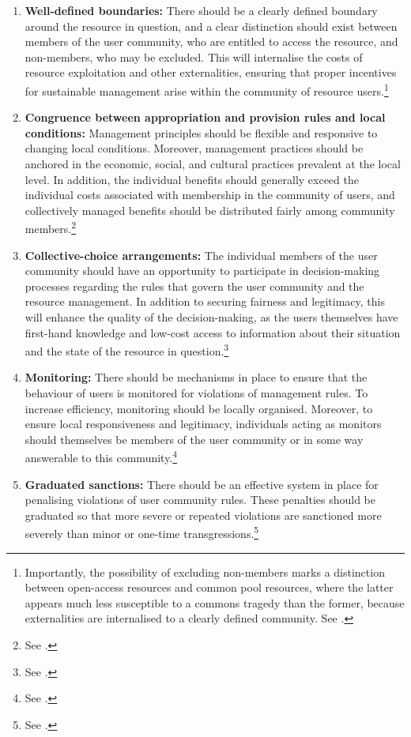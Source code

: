 \begin{enumerate}
\item {\bf Well-defined boundaries:} There should be a clearly defined boundary around the resource in question, and a clear distinction should exist between members of the user community, who are entitled to access the resource, and non-members, who may be excluded. This will internalise the costs of resource exploitation and other externalities, ensuring that proper incentives for sustainable management arise within the community of resource users.\footnote{Importantly, the possibility of excluding non-members marks a distinction between open-access resources and common pool resources, where the latter appears much less susceptible to a commons tragedy than the former, because externalities are internalised to a clearly defined community. See \cite[91-92]{ostrom90}.}
\item {\bf Congruence between appropriation and provision rules and local conditions:} Management principles should be flexible and responsive to changing local conditions. Moreover, management practices should be anchored in the economic, social, and cultural practices prevalent at the local level. In addition, the individual benefits should generally exceed the individual costs associated with membership in the community of users, and collectively managed benefits should be distributed fairly among community members.\footnote{See \cite[92]{ostrom90}.}
\item {\bf Collective-choice arrangements:} The individual members of the user community should have an opportunity to participate in decision-making processes regarding the rules that govern the user community and the resource management. In addition to securing fairness and legitimacy, this will enhance the quality of the decision-making, as the users themselves have first-hand knowledge and low-cost access to information about their situation and the state of the resource in question.\footnote{See \cite[93]{ostrom90}.}
\item {\bf Monitoring:} There should be mechanisms in place to ensure that the behaviour of users is monitored for violations of management rules. To increase efficiency, monitoring should be locally organised. Moreover, to ensure local responsiveness and legitimacy, individuals acting as monitors should themselves be members of the user community or in some way answerable to this community.\footnote{See \cite[94-100]{ostrom90}.}
\item {\bf Graduated sanctions:} There should be an effective system in place for penalising violations of user community rules. These penalties should be graduated so that more severe or repeated violations are sanctioned more severely than minor or one-time transgressions.\footnote{See \cite[94-100]{ostrom90}.}

\end{enumerate}
